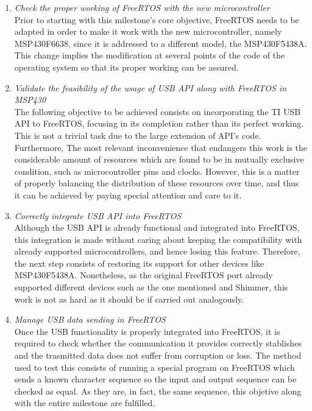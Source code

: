 		\begin{enumerate}
			\item \emph{Check the proper working of FreeRTOS with the new microcontroller}\\
				Prior to starting with this milestone's core objective, FreeRTOS needs to be adapted in order to
				make it work with the new microcontroller, namely MSP430F6638, since it is addressed to a
				different model, the MSP430F5438A. This change implies the modification at several points of the
				code of the operating system so that its proper working can be assured.\\

			\item \emph{Validate the feasibility of the usage of USB API along with FreeRTOS in MSP430}\\
				The following objective to be achieved consists on incorporating the TI USB API to FreeRTOS,
				focusing in its completion rather than its perfect working. This is not a trivial task due to the
				large extension of API's code. Furthermore, The most relevant inconvenience that endangers this
				work is the considerable amount of resources which are found to be in mutually exclusive
				condition, such as microcontroller pins and clocks. However, this is a matter of properly
				balancing the distribution of these resources over time, and thus it can be achieved by paying
				special attention and care to it.\\

			\item \emph{Correctly integrate USB API into FreeRTOS}\\
				Although the USB API is already functional and integrated into FreeRTOS, this integration is made
				without caring about keeping the compatibility with already supported microcontrollers, and hence
				losing this feature. Therefore, the next step consists of restoring its support for other devices
				like MSP430F5438A. Nonetheless, as the original FreeRTOS port already supported different devices
				such as the one mentioned and Shimmer\texttrademark, this work is not as hard as it should be if
				carried out analogously.\\

			\item \emph{Manage USB data sending in FreeRTOS}\\
				Once the USB functionality is properly integrated into FreeRTOS, it is required to check whether
				the communication it provides correctly stablishes and the trasmitted data does not suffer from
				corruption or loss. The method used to test this consists of running a special program on FreeRTOS
				which sends a known character sequence so the input and output sequence can be checked as equal.
				As they are, in fact, the same sequence, this objetive along with the entire milestone are
				fulfilled.\\

		\end{enumerate}

